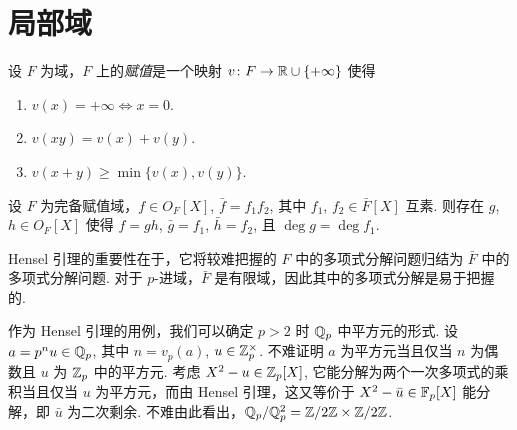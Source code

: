 \section{局部域}
\begin{defn}
  设 $F$ 为域，$F$ 上的\emph{赋值}是一个映射 $v \colon F \to \mathbb R \cup \{+\infty\}$ 使得
  \begin{enumerate}
  \item $v(x) = +\infty \Leftrightarrow x = 0$.
  \item $v(xy) = v(x) + v(y)$.
  \item $v(x+y) \ge \min \{v(x), v(y)\}$.
  \end{enumerate}
\end{defn}

\begin{thm}[Hensel 引理]
  设 $F$ 为完备赋值域，$f \in O_F[X]$, $\bar f = f_1 f_2$, 其中 $f_1$, $f_2 \in \bar F[X]$ 互素.  则存在 $g$, $h \in O_F[X]$ 使得 $f = gh$, $\bar g = f_1$, $\bar h = f_2$, 且 $\deg g = \deg f_1$.
\end{thm}

Hensel 引理的重要性在于，它将较难把握的 $F$ 中的多项式分解问题归结为 $\bar F$ 中的多项式分解问题.  对于 $p$-进域，$\bar F$ 是有限域，因此其中的多项式分解是易于把握的.

作为 Hensel 引理的用例，我们可以确定 $p > 2$ 时 $\mathbb Q_p$ 中平方元的形式.  设 $a = p^n u \in \mathbb Q_p$, 其中 $n = v_p(a)$, $u \in \mathbb Z_p^\times$.  不难证明 $a$ 为平方元当且仅当 $n$ 为偶数且 $u$ 为 $\mathbb Z_p$ 中的平方元.  考虑 $X^2 - u \in \mathbb Z_p[X]$, 它能分解为两个一次多项式的乘积当且仅当 $u$ 为平方元，而由 Hensel 引理，这又等价于 $X^2 - \bar u \in \mathbb F_p[X]$ 能分解，即 $\bar u$ 为二次剩余.  不难由此看出，$\mathbb Q_p / \mathbb Q_p^2 = \mathbb Z/2\mathbb Z \times \mathbb Z/2\mathbb Z$.
